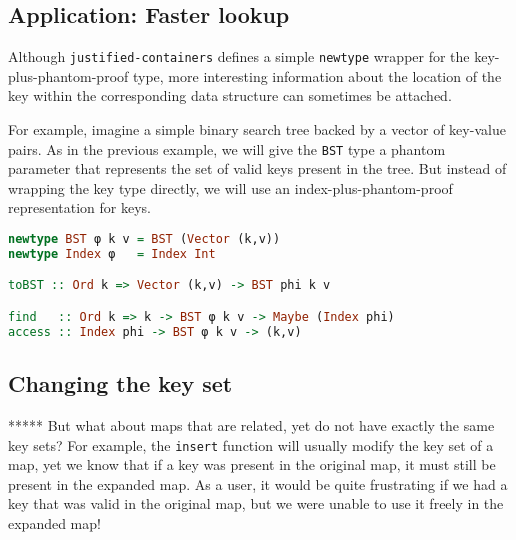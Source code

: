 \documentclass[format=sigplan, review=false, screen=true]{acmart}
\begin{document}
\subsection{Application: Faster lookup}
Although \texttt{justified-containers} defines a simple \texttt{newtype} wrapper for
the key-plus-phantom-proof type, more interesting information about the location of
the key within the corresponding data structure can sometimes be attached.

For example, imagine a simple binary search tree backed by a vector of key-value pairs.
As in the previous example, we will give the \texttt{BST} type a phantom parameter that
represents the set of valid keys present in the tree. But instead of wrapping the key
type directly, we will use an index-plus-phantom-proof representation for keys.

\begin{lstlisting}[language=Haskell]
newtype BST φ k v = BST (Vector (k,v))
newtype Index φ   = Index Int

toBST :: Ord k => Vector (k,v) -> BST phi k v

find   :: Ord k => k -> BST φ k v -> Maybe (Index phi)
access :: Index phi -> BST φ k v -> (k,v)
\end{lstlisting}

\subsection{Changing the key set}
*****
But what about maps that are related, yet do not have exactly the same key sets?
For example, the \texttt{insert} function will usually modify the key set of a map,
yet we know that if a key was present in the original map, it must still be present
in the expanded map. As a user, it would be quite frustrating if we had a key that
was valid in the original map, but we were unable to use it freely in the expanded map!
\end{document}
